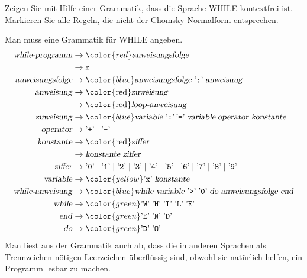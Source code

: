 Zeigen Sie mit Hilfe einer Grammatik, dass die Sprache WHILE kontextfrei ist.
Markieren Sie alle Regeln, die nicht der Chomsky-Normalform entsprechen.


\begin{loesung}
Man muss eine Grammatik für WHILE angeben.
\begin{align*}
\text{\textsl{while-programm}}&\to{\color{red}\text{\textsl{anweisungsfolge}}}\\
&\to\varepsilon\\
\text{\textsl{anweisungsfolge}}
&\to{\color{blue}\text{\textsl{anweisungsfolge}}\;\text{'{\tt ;}'}\;
\text{\textsl{anweisung}}}
\\
\text{\textsl{anweisung}}
&\to\text{\color{red}\textsl{zuweisung}}
\\
&\to\text{\color{red}\textsl{loop-anweisung}}
\\
\text{\textsl{zuweisung}}
&\to
{\color{blue}
\text{\textsl{variable}}\; \text{'{\tt :}'}\, \text{'{\tt =}'}\;
\textsl{variable}\;\text{\textsl{operator}}\;\text{\textsl{konstante}}}
\\
\text{\textsl{operator}}
&\to\text{'{\tt +}'}\;|\;\text{'{\tt -}'}
\\
\text{\textsl{konstante}}&\to\text{\color{red}\textsl{ziffer}}\\
&\to\text{\textsl{konstante}}\;\text{\textsl{ziffer}}
\\
\text{\textsl{ziffer}}&\to 
\text{'{\tt 0}'}\;|\;
\text{'{\tt 1}'}\;|\;
\text{'{\tt 2}'}\;|\;
\text{'{\tt 3}'}\;|\;
\text{'{\tt 4}'}\;|\;
\text{'{\tt 5}'}\;|\;
\text{'{\tt 6}'}\;|\;
\text{'{\tt 7}'}\;|\;
\text{'{\tt 8}'}\;|\;
\text{'{\tt 9}'}\\
\text{\textsl{variable}}&\to{\color{yellow} \text{'{\tt x}'}\;\text{\textsl{konstante}}}\\
\text{\textsl{while-anweisung}}&\to{\color{blue}
\text{\textsl{while}}\;
\text{\textsl{variable}}\;
\text{'{\tt >}'}\;
\text{'{\tt 0}'}\;
\text{\textsl{do}}\;
\text{\textsl{anweisungsfolge}}\;
\text{\textsl{end}}}\\
\text{\textsl{while}}&\to
{\color{green}\text{'{\tt W}'}\; \text{'{\tt H}'}\; \text{'{\tt I}'}\; \text{'{\tt L}'}\; \text{'{\tt E}'}}\\
\text{\textsl{end}}&\to{\color{green} \text{'{\tt E}'}\; \text{'{\tt N}'}\; \text{'{\tt D}'}}\\
\text{\textsl{do}}&\to{\color{green} \text{'{\tt D}'}\; \text{'{\tt O}'}} \\
\end{align*}
Man liest aus der Grammatik auch ab, dass die in anderen Sprachen als
Trennzeichen nötigen Leerzeichen überflüssig sind, obwohl sie natürlich
helfen, ein Programm lesbar zu machen.


\end{loesung}
